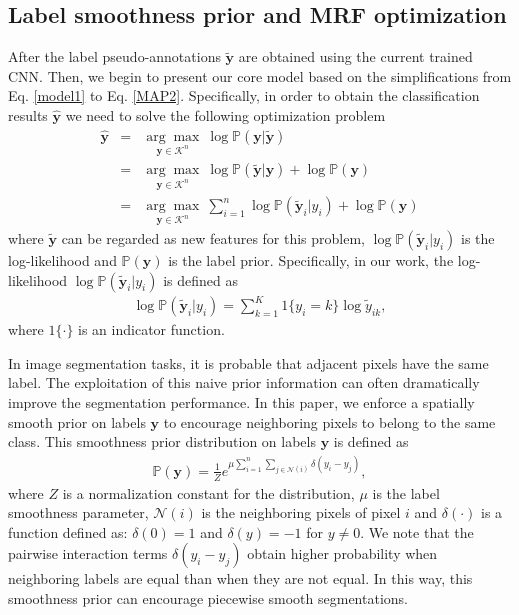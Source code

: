 \documentclass[journal]{IEEEtran}
\begin{document}
	\subsection{Label smoothness prior and MRF optimization}
	After the label {{pseudo-annotations $\widetilde{\mathbf{y}}$ are obtained using the current trained CNN. Then, we begin to present our core model based on the simplifications from Eq. \ref{model1} to Eq. \ref{MAP2}.  Specifically, in order to obtain the classification results $\widehat{\mathbf{y}}$}} we need to solve the following optimization problem
	\begin{eqnarray}\label{segmodel}
	\widehat{\mathbf{y}} &=& \underset{\mathbf{y}\in\mathcal{K}^{n}}{\arg\max}~\log\mathbb{P}(\mathbf{y}|\widetilde{\mathbf{y}})\nonumber \\
	&=&\underset{\mathbf{y}\in\mathcal{K}^{n}}{\arg\max}~\log\mathbb{P}(\widetilde{\mathbf{y}}|\mathbf{y}) + \log\mathbb{P}(\mathbf{y})\nonumber \\
	&=&\underset{\mathbf{y}\in\mathcal{K}^{n}}{\arg\max}~\sum_{i=1}^{n}\log\mathbb{P}(\widetilde{\mathbf{y}}_{i}|{y}_{i}) + \log\mathbb{P}(\mathbf{y})
	\end{eqnarray}
	where $\widetilde{\mathbf{y}}$ can be regarded as new features for this problem, $\log\mathbb{P}(\widetilde{\mathbf{y}}_{i}|{y}_{i})$ is the log-likelihood and $\mathbb{P}(\mathbf{y})$ is the label prior. Specifically, in our work, the log-likelihood $\log\mathbb{P}(\widetilde{\mathbf{y}}_{i}|{y}_{i})$ is defined as
	\begin{eqnarray}\label{single_prior}
	\log\mathbb{P}(\widetilde{\mathbf{y}}_{i}|{y}_{i})=\sum_{k=1}^{K}1\{y_{i}=k\}
	\log{\widetilde{{y}}_{ik}},
	\end{eqnarray}
	where $1\{\cdot\}$ is an indicator function. 
	
	In image segmentation tasks, it is probable that adjacent pixels have the same label. The exploitation of this naive prior information can often dramatically improve the segmentation performance. In this paper, we enforce a spatially smooth prior on labels $\mathbf{y}$ to encourage neighboring pixels to belong to the same class. This smoothness prior distribution on labels $\mathbf{y}$ is defined as  
	\begin{eqnarray}\label{labelprior}
	\mathbb{P}(\mathbf{y}) = \frac{1}{Z}e^{\mu\sum_{i=1}^{n}\sum_{j\in\mathcal{N}(i)}\delta(y_{i}-y_{j})},
	\end{eqnarray} 
	where $Z$ is a normalization constant for the distribution, $\mu$ is the label smoothness parameter, $\mathcal{N}(i)$ is the neighboring pixels of pixel $i$ and $\delta(\cdot)$ is a function defined as: $\delta(0)=1$ and $\delta(y)=-1$ for $y\neq 0$. We note that the pairwise interaction terms $\delta(y_{i}-y_{j})$ obtain higher probability when neighboring labels are equal than when they are not equal. In this way, this smoothness prior can encourage piecewise smooth segmentations.
	
\end{document}
